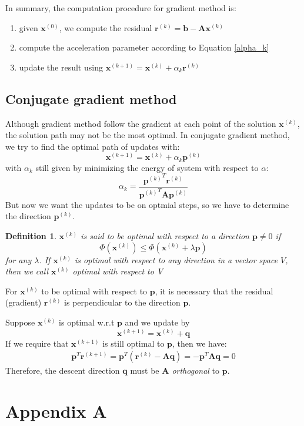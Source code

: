 \documentclass{article}
\newtheorem*{definition}{Definition}
\begin{document}
In summary, the computation procedure for gradient method is:
\begin{enumerate}
    \item given $\mathbf{x}^{(0)}$, we compute the residual 
        $\mathbf{r}^{(k)} = \mathbf{b} - \mathbf{A}\mathbf{x}^{(k)}$
    \item compute the acceleration parameter according to Equation \eqref{alpha_k}
    \item update the result using $\mathbf{x}^{(k+1)} = \mathbf{x}^{(k)} + \alpha_k \mathbf{r}^{(k)}$
\end{enumerate}

\subsection{Conjugate gradient method}
Although gradient method follow the gradient at each point of the solution $\mathbf{x}^{(k)}$,
the solution path may not be the most optimal. In conjugate gradient method, we try to find 
the optimal path of updates with:
\begin{equation}
    \mathbf{x}^{(k+1)} = \mathbf{x}^{(k)} + \alpha_k \mathbf{p}^{(k)}
\end{equation}
with $\alpha_k$ still given by minimizing the energy of system with respect to $\alpha$:
\begin{equation}
    \alpha_k = 
    \frac{\left.\mathbf{p}^{(k)}\right.^T \mathbf{r}^{(k)}}
    {\left.\mathbf{p}^{(k)}\right.^T \mathbf{A} \mathbf{p}^{(k)}}
\end{equation}
But now we want the updates to be on optmial steps, so we have to determine the 
direction $\mathbf{p}^{(k)}$.
\begin{definition}
    $\mathbf{x}^{(k)}$ is said to be \emph{optimal} with respect to a direction $\mathbf{p}\neq 0$
    if \[\Phi(\mathbf{x}^{(k)})\leq \Phi(\mathbf{x}^{(k)} + \lambda \mathbf{p})\]
    for any $\lambda$. If $\mathbf{x}^{(k)}$ is optimal with respect to any direction in a vector 
    space $V$, then we call $\mathbf{x}^{(k)}$ \emph{optimal with respect to} V
\end{definition}
For $\mathbf{x}^{(k)}$ to be optimal with respect to $\mathbf{p}$, it is necessary that 
the residual (gradient) $\mathbf{r}^{(k)}$ is perpendicular to the direction $\mathbf{p}$.

Suppose $\mathbf{x}^{(k)}$ is optimal w.r.t $\mathbf{p}$ and we update by 
\[\mathbf{x}^{(k+1)} = \mathbf{x}^{(k)} + \mathbf{q}\]
If we require that $\mathbf{x}^{(k+1)}$ is still optimal to $\mathbf{p}$, then 
we have:
\begin{align*}
    \mathbf{p}^T \mathbf{r}^{(k+1)} 
    = \mathbf{p}^T \left( \mathbf{r}^{(k)} - \mathbf{A}\mathbf{q} \right)
    = - \mathbf{p}^T \mathbf{A}\mathbf{q} = 0
\end{align*}
Therefore, the descent direction $\mathbf{q}$ must be \emph{$\mathbf{A}$ orthogonal} to 
$\mathbf{p}$. 



\pagebreak
\section*{Appendix A}
\end{document}
